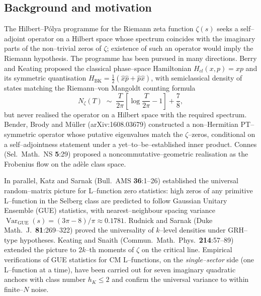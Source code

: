 \documentclass[11pt]{amsart}
\theoremstyle{definition}
\theoremstyle{remark}
\DeclareMathOperator{\Var}{Var}
\newcommand{\BK}{\mathrm{BK}}
\begin{document}
\subsection{Background and motivation}\label{ssec:back}
The Hilbert--P\'olya programme for the Riemann zeta function
\(\zeta(s)\) seeks a self--adjoint operator on a Hilbert space whose
spectrum coincides with the imaginary parts of the non--trivial zeros
of \(\zeta\); existence of such an operator would imply the Riemann
hypothesis. The programme has been pursued in many directions. Berry
and Keating \cite{BerryKeating1999a,BerryKeating1999b} proposed the
classical phase--space Hamiltonian \(H_{cl}(x, p) = xp\) and its
symmetric quantisation
\(H_{\BK} = \tfrac{1}{2}(\hat x \hat p + \hat p \hat x)\), with
semiclassical density of states matching the Riemann--von Mangoldt
counting formula
\[
  N_\zeta(T)
  \;\sim\;
  \frac{T}{2\pi}\!\left[ \log\frac{T}{2\pi} - 1 \right] + \frac{7}{8} ,
\]
but never realised the operator on a Hilbert space with the required
spectrum. Bender, Brody and M\"uller \cite{BBM2017} (arXiv:1608.03679)
constructed a non--Hermitian PT--symmetric operator whose putative
eigenvalues match the \(\zeta\)--zeros, conditional on a
self--adjointness statement under a yet--to--be--established inner
product. Connes \cite{Connes1999} (Sel.\ Math.\ NS \textbf{5}:29)
proposed a noncommutative--geometric realisation as the Frobenius
flow on the ad\`ele class space.

In parallel, Katz and Sarnak \cite{KatzSarnak1999} (Bull.~AMS
\textbf{36}:1--26) established the universal random--matrix picture for
L--function zero statistics: high zeros of any primitive L--function
in the Selberg class are predicted to follow Gaussian Unitary
Ensemble (GUE) statistics, with nearest--neighbour spacing variance
\(\Var_{\mathrm{GUE}}(s) = (3\pi - 8)/\pi \approx 0.1781\). Rudnick and
Sarnak \cite{RudnickSarnak1996} (Duke Math.\ J.\ \textbf{81}:269--322)
proved the universality of \(k\)--level densities under GRH--type
hypotheses. Keating and Snaith \cite{KeatingSnaith2000}
(Commun.\ Math.\ Phys.\ \textbf{214}:57--89) extended the picture to
\(2k\)--th moments of \(\zeta\) on the critical line. Empirical
verifications of GUE statistics for CM L--functions, on the
\emph{single--sector} side (one L--function at a time), have been
carried out for seven imaginary quadratic anchors with class number
\(h_K \le 2\) and confirm the universal variance to within finite--\(N\)
noise.
\end{document}
